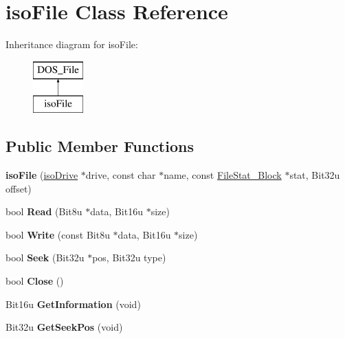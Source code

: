 \hypertarget{classisoFile}{\section{iso\-File Class Reference}
\label{classisoFile}
}
Inheritance diagram for iso\-File\-:\begin{figure}[H]
\begin{center}
\leavevmode
\includegraphics[height=2.000000cm]{classisoFile}
\end{center}
\end{figure}
\subsection*{Public Member Functions}
\begin{DoxyCompactItemize}
\item 
\hypertarget{classisoFile_a6900054cc3b7f4cf4e156f08409f5d88}{{\bfseries iso\-File} (\hyperlink{classisoDrive}{iso\-Drive} $\ast$drive, const char $\ast$name, const \hyperlink{structFileStat__Block}{File\-Stat\-\_\-\-Block} $\ast$stat, Bit32u offset)}\label{classisoFile_a6900054cc3b7f4cf4e156f08409f5d88}

\item 
\hypertarget{classisoFile_ab0640960de5d525449c71bb2258622ee}{bool {\bfseries Read} (Bit8u $\ast$data, Bit16u $\ast$size)}\label{classisoFile_ab0640960de5d525449c71bb2258622ee}

\item 
\hypertarget{classisoFile_a3d8a957425779149fa43b2e494380ec6}{bool {\bfseries Write} (const Bit8u $\ast$data, Bit16u $\ast$size)}\label{classisoFile_a3d8a957425779149fa43b2e494380ec6}

\item 
\hypertarget{classisoFile_a0540cf01d0e167584638b5ee5c116cd3}{bool {\bfseries Seek} (Bit32u $\ast$pos, Bit32u type)}\label{classisoFile_a0540cf01d0e167584638b5ee5c116cd3}

\item 
\hypertarget{classisoFile_a06749457b292297b7830776d113ad886}{bool {\bfseries Close} ()}\label{classisoFile_a06749457b292297b7830776d113ad886}

\item 
\hypertarget{classisoFile_a6e3255593ac75149fac3ab29ddc2a32d}{Bit16u {\bfseries Get\-Information} (void)}\label{classisoFile_a6e3255593ac75149fac3ab29ddc2a32d}

\item 
\hypertarget{classisoFile_a7b78a353cbde35194b15f869d547a763}{Bit32u {\bfseries Get\-Seek\-Pos} (void)}\label{classisoFile_a7b78a353cbde35194b15f869d547a763}

\end{DoxyCompactItemize}


